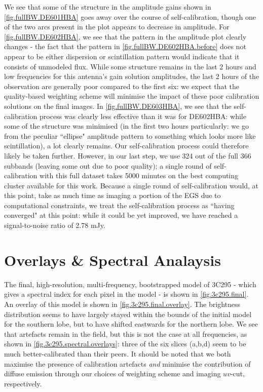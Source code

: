 \pg
We see that some of the structure in the amplitude gains shown in \cref{fig.fullBW.DE601HBA} goes away over the course of self-calibration, though one of the two arcs present in the plot appears to decrease in amplitude. For \cref{fig.fullBW.DE602HBA}, we see that the pattern in the amplitude plot clearly changes - the fact that the pattern in \cref{fig.fullBW.DE602HBA.before} does not appear to be either dispersion or scintillation pattern would indicate that it consists of unmodeled flux. While some structure remains in the last 2 hours and low frequencies for this antenna's gain solution amplitudes, the last 2 hours of the observation are generally poor compared to the first six: we expect that the quality-based weighting scheme will minimise the impact of these poor calibration solutions on the final images. In \cref{fig.fullBW.DE603HBA}, we see that the self-calibration process was clearly less effective than it was for DE602HBA: while some of the structure was minimised (in the first two hours particularly: we go from the peculiar ``ellipse" amplitude pattern to something which looks more like scintillation), a lot clearly remains. Our self-calibration process could therefore likely be taken further. However, in our last step, we use 324 out of the full 366 subbands (leaving some out due to poor quality); a single round of self-calibration with this full dataset takes 5000 minutes on the best computing cluster available for this work. Because a single round of self-calibration would, at this point, take as much time as imaging a portion of the EGS due to computational constraints, we treat the self-calibration process as ``having converged" at this point: while it could be yet improved, we have reached a signal-to-noise ratio of 2.78 mJy. 


\clearpage
\section{Overlays \& Spectral Analaysis}

\pg
The final, high-resolution, multi-frequency, bootstrapped model of 3C295 - which gives a spectral index for each pixel in the model - is shown in \cref{fig.3c295.final}. An overlay of this model is shown in \cref{fig.3c295.final.overlay}. The brightness distribution seems to have largely stayed within the bounds of the initial model for the southern lobe, but to have shifted eastwards for the northern lobe. We see that artefacts remain in the field, but this is not the case at all frequencies, as shown in \cref{fig.3c295.spectral.overlays}: three of the six slices (a,b,d) seem to be much better-calibrated than their peers. It should be noted that we both maximise the presence of calibration artefacts \textit{and} minimise the contribution of diffuse emission through our choices of weighting scheme and imaging $uv$-cut, respectively.

